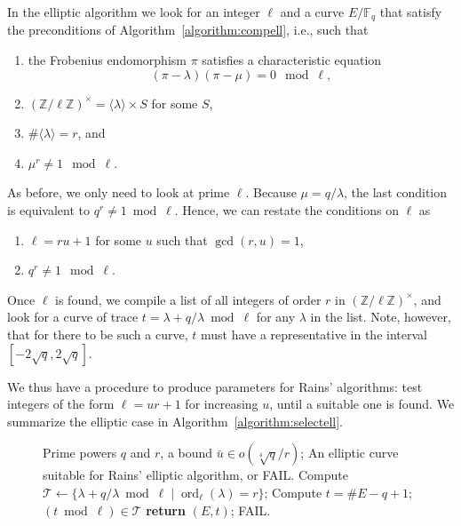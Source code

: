 \documentclass{mcom-l}
\theoremstyle{plain}
\theoremstyle{definition}
\DeclareMathOperator{\order}{ord} %
\newcommand{\Z}{\ensuremath{\mathbb{Z}}}
\newcommand{\F}{\ensuremath{\mathbb{F}}}
\newcounter{algorithm}
\begin{document}
In the elliptic algorithm we look for an integer $\ell$ and a curve
$E/\F_q$ that satisfy the preconditions of
Algorithm~\ref{algorithm:compell}, i.e., such that 
\begin{enumerate}
\item the Frobenius endomorphism $\pi$ satisfies a characteristic
  equation \[(\pi-\lambda)(\pi-\mu) = 0 \mod \ell,\]
\item $(\Z/\ell\Z)^\times = \langle\lambda\rangle\times S$ for some $S$,
\item $\#\langle\lambda\rangle=r$, and
\item $\mu^r\ne1\mod\ell$.
\end{enumerate}

As before, we only need to look at prime $\ell$. Because
$\mu=q/\lambda$, the last condition is equivalent to
$q^r\ne1\bmod\ell$. Hence, we can restate the conditions on $\ell$ as
\begin{enumerate}
\item $\ell = ru+1$ for some $u$ such that $\gcd(r,u)=1$,
\item $q^r\ne1\mod\ell$.
\end{enumerate}
Once $\ell$ is found, we compile a list of all integers of order $r$
in $(\Z/\ell\Z)^\times$, and look for a curve of trace
$t=\lambda+q/\lambda\bmod\ell$ for any $\lambda$ in the list. %
Note, however, that for there to be such a curve, $t$ must have a
representative in the interval $[-2\sqrt{q},2\sqrt{q}]$.

We thus have a procedure to produce parameters for Rains' algorithms:
test integers of the form $\ell=ur+1$ for increasing $u$, until a
suitable one is found. %
We summarize the elliptic case in Algorithm~\ref{algorithm:selectell}.

\begin{figure}
\begin{algorithm}
  \label{algorithm:selectell}
  \begin{algorithmic}[1]
    \REQUIRE Prime powers $q$ and $r$, a bound $\bar{u}\in o(\sqrt[4]{q}/r)$;
    \ENSURE An elliptic curve suitable for Rains' elliptic algorithm, or FAIL.
    \STATE\label{alg:selectell:ellorder} Compute $\mathcal{T} \leftarrow \{\lambda + q/\lambda \bmod\ell \;|\; \order_\ell(\lambda)=r\}$;
    \FOR{each curve $E$ defined over $\F_q$}
    \STATE\label{alg:selectell:pointcount} Compute $t = \#E - q + 1$;
     $(t\bmod\ell)\in\mathcal{T}$ {\bf return} $(E, t)$;
    \ENDFOR
    \ENDIF
    \ENDFOR
    \RETURN FAIL.
  \end{algorithmic}
\end{algorithm}
\end{figure}  
\end{document}
